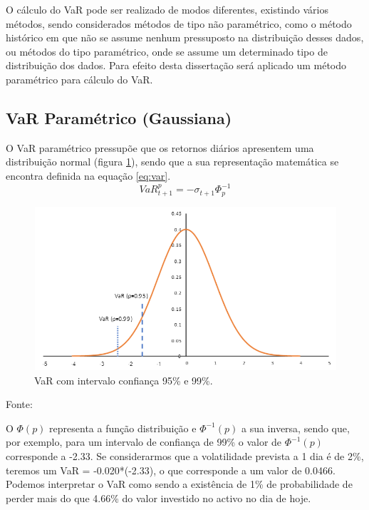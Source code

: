 \documentclass[
  12pt,
  a4paper,
  openany]{book}
\begin{document}
O cálculo do VaR pode ser realizado de modos diferentes, existindo vários métodos, sendo considerados métodos de tipo não paramétrico, como o método histórico em que não se assume nenhum pressuposto na distribuição desses dados, ou métodos do tipo paramétrico, onde se assume um determinado tipo de distribuição dos dados. Para efeito desta dissertação será aplicado um método paramétrico para cálculo do VaR.

\hypertarget{var-paramuxe9trico-gaussiana}{%
\subsection{VaR Paramétrico (Gaussiana)}\label{var-paramuxe9trico-gaussiana}}

O VaR paramétrico pressupõe que os retornos diários apresentem uma distribuição normal (figura \ref{fig:var}), sendo que a sua representação matemática se encontra definida na equação \eqref{eq:var}.
\begin{equation} 
  VaR_{t+1}^{p} = -\sigma_{t+1}\Phi_{p}^{-1}
  \label{eq:var}
\end{equation}


\begin{figure}

{\centering \includegraphics[width=0.6\linewidth]{image/VaR} 

}

\caption{VaR com intervalo confiança 95\% e 99\%.}\label{fig:var}
\end{figure}
\FloatBarrier
\centering

Fonte: \citep[pp.13]{phdthesis}

\justifying
\bigskip

O \(\Phi (p)\) representa a função distribuição e \(\Phi^{-1} (p)\) a sua inversa, sendo que, por exemplo, para um intervalo de confiança de 99\% o valor de \(\Phi^{-1} (p)\) corresponde a -2.33. Se considerarmos que a volatilidade prevista a 1 dia é de 2\%, teremos um VaR = -0.020*(-2.33), o que corresponde a um valor de 0.0466. Podemos interpretar o VaR como sendo a existência de 1\% de probabilidade de perder mais do que 4.66\% do valor investido no activo no dia de hoje.
\end{document}

